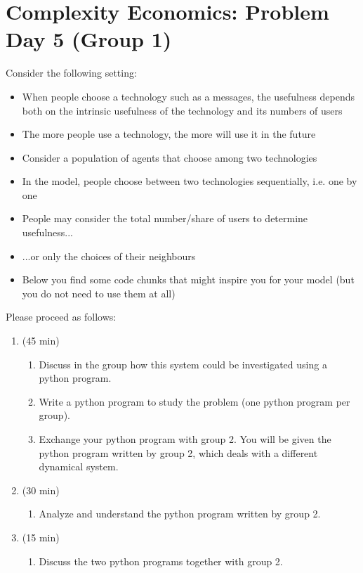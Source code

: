 \documentclass[25pt,a4paper]{article}
\begin{document}
\setlength{\emergencystretch}{0.5cm}
\pagestyle{empty}
\newcommand{\thegroup}{1}
\newcommand{\ifcasewrapper}[1]
{\ifcase#1\relax\or 
    \newcommand{\theothergroup}{2} %
\or 
    \newcommand{\theothergroup}{1} %
\or 
    \newcommand{\theothergroup}{4} %
\or 
    \newcommand{\theothergroup}{3} %
\fi
}
\ifcasewrapper{\thegroup}
\section*{Complexity Economics: Problem Day 5 (Group \thegroup)}

Consider the following setting:
\begin{itemize}
  \item When people choose a technology such as a messages, the usefulness depends both on the intrinsic usefulness of the technology and its numbers of users
  \item The more people use a technology, the more will use it in the future
  \item Consider a population of agents that choose among two technologies
  \item In the model, people choose between two technologies sequentially, i.e. one by one 
  \item People may consider the total number/share of users to determine usefulness...
  \item ...or only the choices of their neighbours
  \item Below you find some code chunks that might inspire you for your model (but you do not need to use them at all)
\end{itemize}

$$$$
Please proceed as follows:
\begin{enumerate}
\item (45 min)
\begin{enumerate}
\item Discuss in the group how this system could be investigated using a python program.
\item Write a python program to study the problem (one python program per group).
\item Exchange your python program with group \theothergroup. You will be given the python program written by group \theothergroup, which deals with a different dynamical system.
\end{enumerate}
\item (30 min)
\begin{enumerate}
\item Analyze and understand the python program written by group \theothergroup.
\end{enumerate}
\item (15 min)
\begin{enumerate}
\item Discuss the two python programs together with group \theothergroup.
\end{enumerate}
\end{enumerate}
\end{document}
